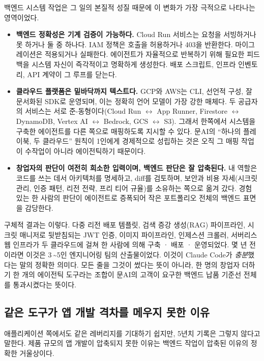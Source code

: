 \documentclass{article}
\begin{document}
백엔드 시스템 작업은 그 일의 본질적 성질 때문에 이 변화가 가장 극적으로 나타나는 영역이었다.

\begin{itemize}
    \item \textbf{백엔드 정확성은 기계 검증이 가능하다.} Cloud Run 서비스는 요청을 서빙하거나 못 하거나 둘 중 하나다. IAM 정책은 호출을 허용하거나 403을 반환한다. 마이그레이션은 적용되거나 실패한다. 에이전트가 자율적으로 반복하기 위해 필요한 피드백을 시스템 자신이 즉각적이고 명확하게 생성한다. 배포 스크립트, 인프라 인벤토리, API 계약이 그 루프를 닫는다.
    \item \textbf{클라우드 플랫폼은 밑바닥까지 텍스트다.} GCP와 AWS는 CLI, 선언적 구성, 잘 문서화된 SDK로 운영되며, 이는 정확히 언어 모델이 가장 강한 매체다. 두 공급자의 서비스는 서로 준-동형이다(Cloud Run $\leftrightarrow$ App Runner, Firestore $\leftrightarrow$ DynamoDB, Vertex AI $\leftrightarrow$ Bedrock, GCS $\leftrightarrow$ S3). 그래서 한쪽에서 시스템을 구축한 에이전트를 다른 쪽으로 매핑하도록 지시할 수 있다. 문AI의 ``하나의 플레이북, 두 클라우드'' 원칙이 1인에게 경제적으로 성립하는 것은 오직 그 매핑 작업이 수작업이 아니라 에이전틱하기 때문이다.
    \item \textbf{창업자의 판단이 여전히 희소한 입력이며, 백엔드 판단은 잘 압축된다.} 내 역할은 코드를 쓰는 데서 아키텍처를 명세하고, diff를 검토하며, 보안과 비용 자세(시크릿 관리, 인증 패턴, 리전 전략, 프리 티어 규율)를 소유하는 쪽으로 옮겨 갔다. 경험 있는 한 사람의 판단이 에이전트로 증폭되어 작은 포트폴리오 전체의 백엔드 표면을 감당한다.
\end{itemize}

구체적 결과는 이렇다. 다중 리전 배포 템플릿, 검색 증강 생성(RAG) 파이프라인, 시크릿 매니저로 뒷받침되는 JWT 인증, 이미지 파이프라인, 인제스션 크롤러, 서버리스 웹 인프라가 두 클라우드에 걸쳐 한 사람에 의해 구축 · 배포 · 운영되었다. 몇 년 전이라면 이것은 3\,\textasciitilde 5인 엔지니어링 팀의 산출물이었다. 이것이 Claude Code가 \emph{충분}했다는 말의 정확한 의미다. 모든 줄을 그것이 썼다는 뜻이 아니라, 한 명의 창업자 더하기 한 개의 에이전틱 도구라는 조합이 문AI의 고객이 요구한 백엔드 납품 기준선 전체를 통과시켰다는 뜻이다.

\subsection{같은 도구가 앱 개발 격차를 메우지 못한 이유}

애플리케이션 쪽에서도 같은 레버리지를 기대하기 쉽지만, 5년치 기록은 그렇지 않다고 말한다. 제품 규모의 앱 개발이 압축되지 못한 이유는 백엔드 작업이 압축된 이유의 정확한 거울상이다.
\end{document}
